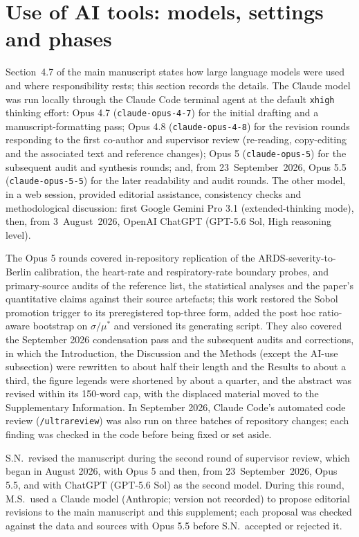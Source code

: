 \documentclass[pdflatex,sn-nature]{sn-jnl}%
\newcommand{\mainref}[2]{#2}
\begin{document}

\section{Use of AI tools: models, settings and phases}\label{sec:s18}

Section~\mainref{sec:methods-ai}{4.7} of the main manuscript states how large language models were used and where responsibility rests; this section records the details. The Claude model was run locally through the Claude Code terminal agent at the default \texttt{xhigh} thinking effort: Opus 4.7 (\texttt{claude-opus-4-7}) for the initial drafting and a manuscript-formatting pass; Opus 4.8 (\texttt{claude-opus-4-8}) for the revision rounds responding to the first co-author and supervisor review (re-reading, copy-editing and the associated text and reference changes); Opus 5 (\texttt{claude-opus-5}) for the subsequent audit and synthesis rounds; and, from 23~September~2026, Opus 5.5 (\texttt{claude-opus-5-5}) for the later readability and audit rounds. The other model, in a web session, provided editorial assistance, consistency checks and methodological discussion: first Google Gemini Pro 3.1 (extended-thinking mode), then, from 3~August~2026, OpenAI ChatGPT (GPT-5.6 Sol, High reasoning level).

The Opus 5 rounds covered in-repository replication of the ARDS-severity-to-Berlin calibration, the heart-rate and respiratory-rate boundary probes, and primary-source audits of the reference list, the statistical analyses and the paper's quantitative claims against their source artefacts; this work restored the Sobol promotion trigger to its preregistered top-three form, added the post hoc ratio-aware bootstrap on $\sigma / \mu^{*}$ and versioned its generating script. They also covered the September 2026 condensation pass and the subsequent audits and corrections, in which the Introduction, the Discussion and the Methods (except the AI-use subsection) were rewritten to about half their length and the Results to about a third, the figure legends were shortened by about a quarter, and the abstract was revised within its 150-word cap, with the displaced material moved to the Supplementary Information. In September 2026, Claude Code's automated code review (\texttt{/ultrareview}) was also run on three batches of repository changes; each finding was checked in the code before being fixed or set aside.

S.N.\ revised the manuscript during the second round of supervisor review, which began in August 2026, with Opus 5 and then, from 23~September~2026, Opus 5.5, and with ChatGPT (GPT-5.6 Sol) as the second model. During this round, M.S.\ used a Claude model (Anthropic; version not recorded) to propose editorial revisions to the main manuscript and this supplement; each proposal was checked against the data and sources with Opus 5.5 before S.N.\ accepted or rejected it.


\end{document}

